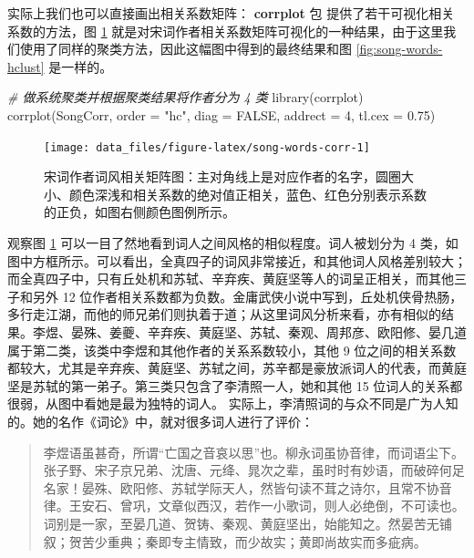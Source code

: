 \documentclass[
  b5paper,
  UTF8,twoside]{book}
\newenvironment{Shaded}{\begin{snugshade}}{\end{snugshade}}
\newcommand{\AttributeTok}[1]{\textcolor[rgb]{0.77,0.63,0.00}{#1}}
\newcommand{\CommentTok}[1]{\textcolor[rgb]{0.56,0.35,0.01}{\textit{#1}}}
\newcommand{\ConstantTok}[1]{\textcolor[rgb]{0.00,0.00,0.00}{#1}}
\newcommand{\DecValTok}[1]{\textcolor[rgb]{0.00,0.00,0.81}{#1}}
\newcommand{\FloatTok}[1]{\textcolor[rgb]{0.00,0.00,0.81}{#1}}
\newcommand{\FunctionTok}[1]{\textcolor[rgb]{0.00,0.00,0.00}{#1}}
\newcommand{\NormalTok}[1]{#1}
\newcommand{\StringTok}[1]{\textcolor[rgb]{0.31,0.60,0.02}{#1}}
\begin{document}
实际上我们也可以直接画出相关系数矩阵： \textbf{corrplot} 包 \citep{corrplot} 提供了若干可视化相关系数的方法，图 \ref{fig:song-words-corr} 就是对宋词作者相关系数矩阵可视化的一种结果，由于这里我们使用了同样的聚类方法，因此这幅图中得到的最终结果和图 \ref{fig:song-words-hclust} 是一样的。

\begin{Shaded}
\begin{Highlighting}[]
\CommentTok{\# 做系统聚类并根据聚类结果将作者分为 4 类}
\FunctionTok{library}\NormalTok{(corrplot)}
\FunctionTok{corrplot}\NormalTok{(SongCorr, }\AttributeTok{order =} \StringTok{"hc"}\NormalTok{, }\AttributeTok{diag =} \ConstantTok{FALSE}\NormalTok{, }\AttributeTok{addrect =} \DecValTok{4}\NormalTok{, }\AttributeTok{tl.cex =} \FloatTok{0.75}\NormalTok{)}
\end{Highlighting}
\end{Shaded}

\begin{figure}

{\centering \texttt{[image: data\_files/figure-latex/song-words-corr-1]} 

}

\caption[ 宋词作者词风相关矩阵图 ]{宋词作者词风相关矩阵图：主对角线上是对应作者的名字，圆圈大小、颜色深浅和相关系数的绝对值正相关，蓝色、红色分别表示系数的正负，如图右侧颜色图例所示。}\label{fig:song-words-corr}
\end{figure}



观察图 \ref{fig:song-words-corr} 可以一目了然地看到词人之间风格的相似程度。词人被划分为 4 类，如图中方框所示。可以看出，全真四子的词风非常接近，和其他词人风格差别较大； 而全真四子中，只有丘处机和苏轼、辛弃疾、黄庭坚等人的词呈正相关，而其他三子和另外 12 位作者相关系数都为负数。金庸武侠小说中写到，丘处机侠骨热肠，多行走江湖，而他的师兄弟们则执着于道；从这里词风分析来看，亦有相似的结果。李煜、晏殊、姜夔、辛弃疾、黄庭坚、苏轼、秦观、周邦彦、欧阳修、晏几道属于第二类，该类中李煜和其他作者的关系系数较小，其他 9 位之间的相关系数都较大，尤其是辛弃疾、黄庭坚、苏轼之间，苏辛都是豪放派词人的代表，而黄庭坚是苏轼的第一弟子。第三类只包含了李清照一人，她和其他 15 位词人的关系都很弱，从图中看她是最为独特的词人。 实际上，李清照词的与众不同是广为人知的。她的名作《词论》中，就对很多词人进行了评价：

\begin{quote}
李煜语虽甚奇，所谓``亡国之音哀以思''也。柳永词虽协音律，而词语尘下。张子野、宋子京兄弟、沈唐、元绛、晁次之辈，虽时时有妙语，而破碎何足名家！晏殊、欧阳修、苏轼学际天人，然皆句读不茸之诗尔，且常不协音律。王安石、曾巩，文章似西汉，若作一小歌词，则人必绝倒，不可读也。词别是一家，至晏几道、贺铸、秦观、黄庭坚出，始能知之。然晏苦无铺叙；贺苦少重典；秦即专主情致，而少故实；黄即尚故实而多疵病。
\end{quote}
\end{document}
